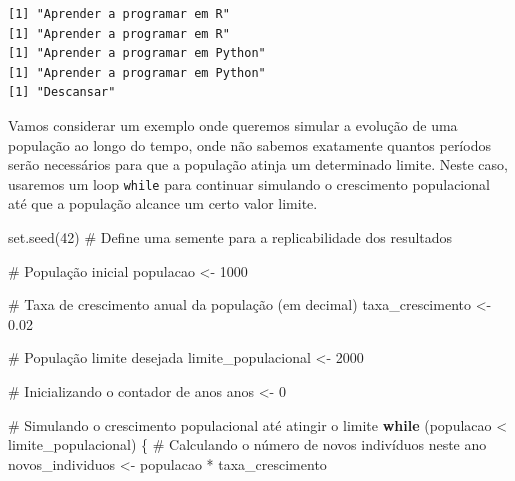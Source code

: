 \documentclass[
  portuguese,
  letterpaper,
  DIV=11,
  numbers=noendperiod]{scrreprt}
\newenvironment{Shaded}{\begin{snugshade}}{\end{snugshade}}
\newcommand{\CommentTok}[1]{\textcolor[rgb]{0.37,0.37,0.37}{#1}}
\newcommand{\ControlFlowTok}[1]{\textcolor[rgb]{0.00,0.23,0.31}{\textbf{#1}}}
\newcommand{\DecValTok}[1]{\textcolor[rgb]{0.68,0.00,0.00}{#1}}
\newcommand{\FloatTok}[1]{\textcolor[rgb]{0.68,0.00,0.00}{#1}}
\newcommand{\FunctionTok}[1]{\textcolor[rgb]{0.28,0.35,0.67}{#1}}
\newcommand{\NormalTok}[1]{\textcolor[rgb]{0.00,0.23,0.31}{#1}}
\newcommand{\OtherTok}[1]{\textcolor[rgb]{0.00,0.23,0.31}{#1}}
\newcommand{\SpecialCharTok}[1]{\textcolor[rgb]{0.37,0.37,0.37}{#1}}
\theoremstyle{definition}
\theoremstyle{remark}
\begin{document}
\begin{verbatim}
[1] "Aprender a programar em R"
[1] "Aprender a programar em R"
[1] "Aprender a programar em Python"
[1] "Aprender a programar em Python"
[1] "Descansar"
\end{verbatim}

\begin{tcolorbox}[enhanced jigsaw, leftrule=.75mm, opacitybacktitle=0.6, colback=white, coltitle=black, colframe=quarto-callout-tip-color-frame, titlerule=0mm, left=2mm, opacityback=0, breakable, bottomtitle=1mm, toprule=.15mm, title=\textcolor{quarto-callout-tip-color}{\faLightbulb}\hspace{0.5em}{Clique e veja um exemplo extra}, colbacktitle=quarto-callout-tip-color!10!white, arc=.35mm, rightrule=.15mm, bottomrule=.15mm, toptitle=1mm]

Vamos considerar um exemplo onde queremos simular a evolução de uma
população ao longo do tempo, onde não sabemos exatamente quantos
períodos serão necessários para que a população atinja um determinado
limite. Neste caso, usaremos um loop \texttt{while} para continuar
simulando o crescimento populacional até que a população alcance um
certo valor limite.

\begin{Shaded}
\begin{Highlighting}[]
\FunctionTok{set.seed}\NormalTok{(}\DecValTok{42}\NormalTok{)  }\CommentTok{\# Define uma semente para a replicabilidade dos resultados}

\CommentTok{\# População inicial}
\NormalTok{populacao }\OtherTok{\textless{}{-}} \DecValTok{1000}

\CommentTok{\# Taxa de crescimento anual da população (em decimal)}
\NormalTok{taxa\_crescimento }\OtherTok{\textless{}{-}} \FloatTok{0.02}

\CommentTok{\# População limite desejada}
\NormalTok{limite\_populacional }\OtherTok{\textless{}{-}} \DecValTok{2000}

\CommentTok{\# Inicializando o contador de anos}
\NormalTok{anos }\OtherTok{\textless{}{-}} \DecValTok{0}

\CommentTok{\# Simulando o crescimento populacional até atingir o limite}
\ControlFlowTok{while}\NormalTok{ (populacao }\SpecialCharTok{\textless{}}\NormalTok{ limite\_populacional) \{}
  \CommentTok{\# Calculando o número de novos indivíduos neste ano}
\NormalTok{  novos\_individuos }\OtherTok{\textless{}{-}}\NormalTok{ populacao }\SpecialCharTok{*}\NormalTok{ taxa\_crescimento}
  

\end{Highlighting}
\end{Shaded}
\end{tcolorbox}
\end{document}
